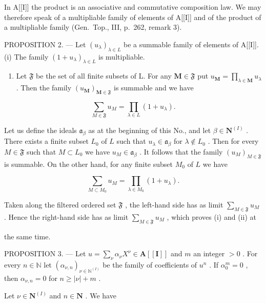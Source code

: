 In A{[}{[}I{]}{]} the product is an associative and commutative composition law. We may therefore speak of a multipliable family of elements of A{[}{[}I{]}{]} and of the product of a multipliable family (Gen.~Top., III, p.~262, remark 3).

PROPOSITION 2. --- Let \((u_{\lambda})_{\lambda \in L}\) be a summable family of elements of A{[}{[}I{]}{]}. (i) The family \((1 + u_{\lambda})_{\lambda \in L}\) is multipliable.

\begin{enumerate}
\def\labelenumi{(\roman{enumi})}
\setcounter{enumi}{1}
\tightlist
\item
  Let \(\mathfrak{F}\) be the set of all finite subsets of L. For any \(\mathbf{M} \in \mathfrak{F}\) put \(u_{\mathbf{M}} = \prod_{\lambda \in \mathbf{M}} u_{\lambda}\) . Then the family \((u_{\mathbf{M}})_{\mathbf{M} \in \mathfrak{F}}\) is summable and we have
\end{enumerate}

\[
\sum_ {M \in \mathfrak {F}} u _ {M} = \prod_ {\lambda \in L} (1 + u _ {\lambda}).
\]

Let us define the ideals \(\mathfrak{a}_{\beta}\) as at the beginning of this No., and let \(\beta \in \mathbf{N}^{(I)}\) . There exists a finite subset \(L_0\) of \(L\) such that \(u_{\lambda} \in \mathfrak{a}_{\beta}\) for \(\lambda \notin L_0\) . Then for every \(M \in \mathfrak{F}\) such that \(M \subset L_0\) we have \(u_M \in \mathfrak{a}_{\beta}\) . It follows that the family \((u_M)_{M \in \mathfrak{F}}\) is summable. On the other hand, for any finite subset \(M_0\) of \(L\) we have

\[
\sum_ {M \subset M _ {0}} u _ {M} = \prod_ {\lambda \in M _ {0}} (1 + u _ {\lambda}).
\]

Taken along the filtered ordered set \(\mathfrak{F}\) , the left-hand side has as limit \(\sum_{M\in\mathfrak{F}}u_{M}\) . Hence the right-hand side has as limit \(\sum_{M\in\mathfrak{F}}u_{M}\) , which proves (i) and (ii) at

the same time.

PROPOSITION 3. --- Let \(u = \sum_{\nu} \alpha_{\nu} X^{\nu} \in \mathbf{A}[[\mathbf{I}]]\) and \(m\) an integer \(> 0\) . For every \(n \in \mathbb{N}\) let \((\alpha_{\nu, n})_{\nu \in \mathbb{N}^{(I)}}\) be the family of coefficients of \(u^n\) . If \(\alpha_0^m = 0\) , then \(\alpha_{\nu, n} = 0\) for \(n \geqslant |\nu| + m\) .

Let \(\nu \in \mathbf{N}^{(I)}\) and \(n\in \mathbf{N}\) . We have

